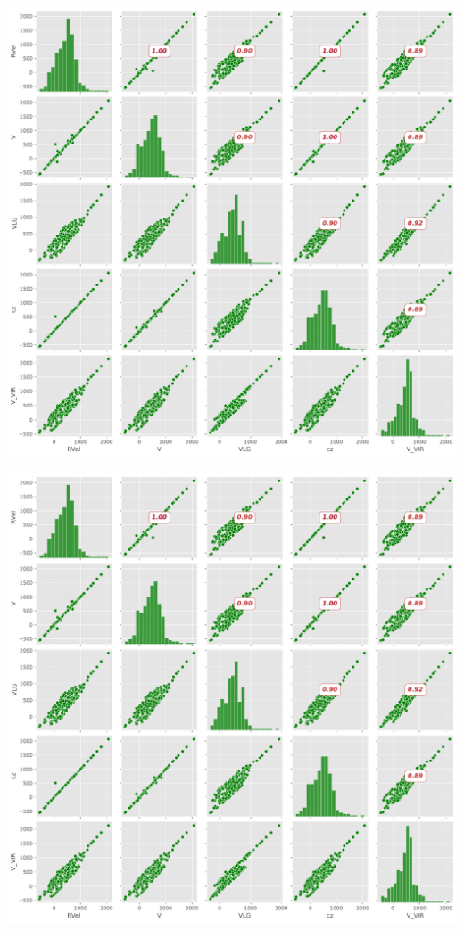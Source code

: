 \documentclass[
]{article}
\begin{document}
\includegraphics{compare_files/figure-pdf/cell-16-output-1.pdf}

\includegraphics{compare_files/figure-pdf/cell-18-output-1.pdf}
\end{document}
